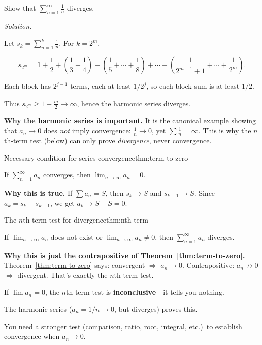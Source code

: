 \begin{examplebox}[title={Worked Example: harmonic series diverges (grouping idea)}]

Show that $\displaystyle \sum_{n=1}^{\infty}\frac{1}{n}$ diverges.

\emph{Solution.}

Let $s_k=\sum_{n=1}^{k}\frac{1}{n}$. For $k=2^m$,

\[
s_{2^m}
=1+\frac12+\left(\frac13+\frac14\right)+\left(\frac15+\cdots+\frac18\right)+\cdots+\left(\frac{1}{2^{m-1}+1}+\cdots+\frac{1}{2^m}\right).
\]

Each block has $2^{j-1}$ terms, each at least $1/2^j$, so each block sum is at least $1/2$.

Thus $s_{2^m}\ge 1+\frac{m}{2}\to\infty$, hence the harmonic series diverges.

\end{examplebox}

\noindent
\textbf{Why the harmonic series is important.}
It is the canonical example showing that $a_n\to 0$ does \emph{not} imply convergence: $\frac{1}{n}\to 0$, yet $\sum \frac{1}{n}=\infty$.
This is why the $n$th-term test (below) can only prove \emph{divergence}, never convergence.

\begin{theorem}{Necessary condition for series convergence}{thm:term-to-zero}

If $\sum_{n=1}^{\infty} a_n$ converges, then $\lim_{n\to\infty} a_n=0$.

\end{theorem}

\noindent
\textbf{Why this is true.}
If $\sum a_n=S$, then $s_k\to S$ and $s_{k-1}\to S$. Since $a_k=s_k-s_{k-1}$, we get $a_k\to S-S=0$.

\begin{theorem}{The $n$th-term test for divergence}{thm:nth-term}

If $\lim_{n\to\infty} a_n$ does not exist or $\lim_{n\to\infty} a_n\ne 0$, then $\sum_{n=1}^{\infty} a_n$ diverges.

\end{theorem}

\noindent
\textbf{Why this is just the contrapositive of Theorem~\ref{thm:term-to-zero}.}
Theorem~\ref{thm:term-to-zero} says: convergent $\Rightarrow$ $a_n\to 0$.
Contrapositive: $a_n\not\to 0$ $\Rightarrow$ divergent.
That's exactly the $n$th-term test.

\begin{commonmistake}[title={Common Mistake: $a_n\to 0$ does NOT imply convergence}]

If $\lim a_n=0$, the $n$th-term test is \textbf{inconclusive}---it tells you nothing.

The harmonic series ($a_n=1/n\to 0$, but diverges) proves this.

You need a stronger test (comparison, ratio, root, integral, etc.)\ to establish convergence when $a_n\to 0$.

\end{commonmistake}

